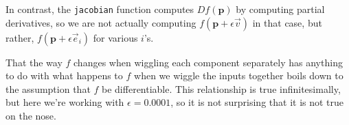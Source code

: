 \documentclass{ximera}
\begin{document}
\begin{exercise}
\begin{free-response}
  In contrast, the \texttt{jacobian} function computes
  $Df(\mathbf{p})$ by computing partial derivatives, so we are not
  actually computing $f(\mathbf{p} + \epsilon \vec{v})$ in that case,
  but rather, $f(\mathbf{p} + \epsilon \vec{e}_i)$ for various $i$'s.

  That the way $f$ changes when wiggling each component separately has
  anything to do with what happens to $f$ when we wiggle the inputs
  together boils down to the assumption that $f$ be differentiable.
  This relationship is true infinitesimally, but here we're working
  with $\epsilon = 0.0001$, so it is not surprising that it is not
  true on the nose.
\end{free-response}

\end{exercise}
\end{document}
